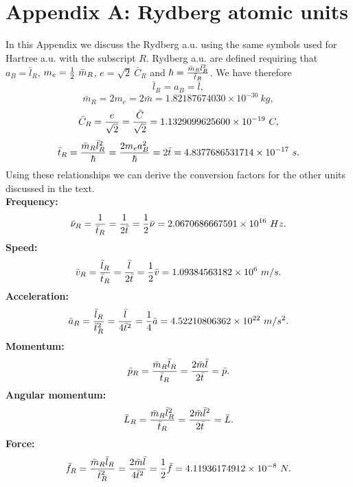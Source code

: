 \documentclass[12pt,a4paper]{article}
\def\barmry{1.82187674030\times 10^{-30}}
\def\bartry{4.8377686531714\times 10^{-17}}
\def\barnury{2.0670686667591\times 10^{16}}
\def\barvry{1.09384563182\times 10^{6}}
\def\barary{4.52210806362\times 10^{22}}
\def\barfry{4.11936174912\times 10^{-8}}
\def\barcry{1.1329099625600\times 10^{-19}}
\begin{document}
\section{\color{coral} Appendix A: Rydberg atomic units}
{\color{violet}
In this Appendix we discuss the Rydberg a.u. using the same 
symbols used for Hartree a.u. with the subscript $R$.
Rydberg a.u. are defined requiring that
$a_B=\bar l_R$, $m_e={1\over 2}\ \bar m_R$, $e=\sqrt{2}\ \bar C_R$ and 
$\hbar= {\bar m_R \bar l_R^2 \over \bar t_R}$.
We have therefore 
\begin{equation}
\bar l_R=a_B=\bar l,
\end{equation}
\begin{equation}
\bar m_R=2 m_e=2 \bar m=\barmry\ kg,
\end{equation}
\begin{equation}
\bar C_R={e \over \sqrt{2}}= {\bar C \over \sqrt{2}}=\barcry\ C,
\end{equation}
\begin{equation}
\bar t_R={\bar m_R \bar l_R^2 \over \hbar}= {2 m_e a_B^2 \over \hbar}=
2 \bar t=\bartry\ s.
\end{equation}
Using these relationships we can derive the conversion factors for
the other units discussed in the text. \\
{\bf Frequency:}
\begin{equation}
\bar \nu_R={1\over \bar t_R}= {1\over 2 \bar t}= {1\over 2}\bar \nu=
\barnury\ Hz.
\end{equation}
{\bf Speed:}
\begin{equation}
\bar v_R={\bar l_R\over \bar t_R}= {\bar l\over 2 \bar t}= {1\over 2}\bar v=
\barvry\ m/s.
\end{equation}
{\bf Acceleration:}
\begin{equation}
\bar a_R={\bar l_R\over \bar t_R^2}= {\bar l\over 4 \bar t^2}=
{1\over 4}\bar a=\barary\ m/s^2.
\end{equation}
{\bf Momentum:}
\begin{equation}
\bar p_R={\bar m_R \bar l_R\over \bar t_R}= {2 \bar m \bar l\over 2 \bar t}= 
\bar p.
\end{equation}
{\bf Angular momentum:}
\begin{equation}
\bar L_R={\bar m_R \bar l_R^2\over \bar t_R}= {2 \bar m \bar l^2\over 2 
\bar t}= \bar L.
\end{equation}
{\bf Force:}
\begin{equation}
\bar f_R={\bar m_R \bar l_R\over \bar t_R^2}= {2 \bar m \bar l\over 4 
\bar t^2}= {1\over 2} \bar f=\barfry\ N.

\end{equation}}
\end{document}

